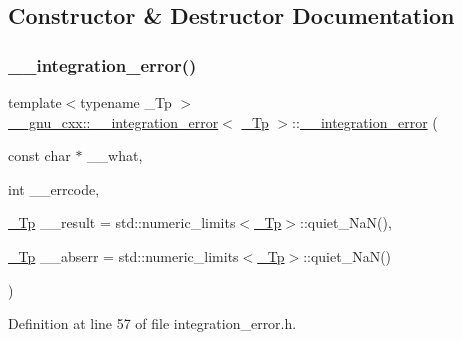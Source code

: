 \subsection{Constructor \& Destructor Documentation}
\mbox{\label{class____gnu__cxx_1_1____integration__error_a4a635205d93f9a0c5d3317903c46d3fd}} 
\subsubsection{\texorpdfstring{\+\_\+\+\_\+integration\+\_\+error()}{\_\_integration\_error()}}
{\footnotesize\ttfamily template$<$typename \+\_\+\+Tp $>$ \\
\hyperlink{class____gnu__cxx_1_1____integration__error}{\+\_\+\+\_\+gnu\+\_\+cxx\+::\+\_\+\+\_\+integration\+\_\+error}$<$ \hyperlink{namespace____gnu__cxx_a3b19a9c800ca194374ef9172290f7d79}{\+\_\+\+Tp} $>$\+::\hyperlink{class____gnu__cxx_1_1____integration__error}{\+\_\+\+\_\+integration\+\_\+error} (\begin{DoxyParamCaption}\item[{const char $\ast$}]{\+\_\+\+\_\+what,  }\item[{int}]{\+\_\+\+\_\+errcode,  }\item[{\hyperlink{namespace____gnu__cxx_a3b19a9c800ca194374ef9172290f7d79}{\+\_\+\+Tp}}]{\+\_\+\+\_\+result = {\ttfamily std\+:\+:numeric\+\_\+limits$<$\hyperlink{namespace____gnu__cxx_a3b19a9c800ca194374ef9172290f7d79}{\+\_\+\+Tp}$>$\+:\+:quiet\+\_\+NaN()},  }\item[{\hyperlink{namespace____gnu__cxx_a3b19a9c800ca194374ef9172290f7d79}{\+\_\+\+Tp}}]{\+\_\+\+\_\+abserr = {\ttfamily std\+:\+:numeric\+\_\+limits$<$\hyperlink{namespace____gnu__cxx_a3b19a9c800ca194374ef9172290f7d79}{\+\_\+\+Tp}$>$\+:\+:quiet\+\_\+NaN()} }\end{DoxyParamCaption})\hspace{0.3cm}{\ttfamily [inline]}}



Definition at line 57 of file integration\+\_\+error.\+h.



